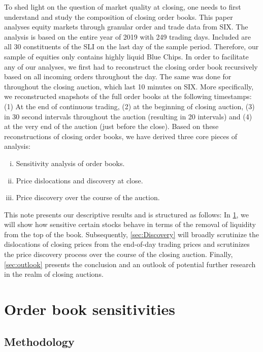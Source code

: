 \documentclass[11pt,a4paper, notitlepage]{article}
\begin{document}
	To shed light on the question of market quality at closing, one needs to first understand and study the composition of closing order books. This paper analyses equity markets through granular order and trade data from \ac{SIX}. The analysis is based on the entire year of 2019 with 249 trading days. Included are all 30 constituents of the \ac{SLI} on the last day of the sample period. Therefore, our sample of equities only contains highly liquid Blue Chips. In order to facilitate any of our analyses, we first had to reconstruct the closing order book recursively based on all incoming orders throughout the day. The same was done for throughout the closing auction, which last 10 minutes on \ac{SIX}. More specifically, we reconstructed snapshots of the full order books at the following timestamps: (1) At the end of continuous trading, (2) at the beginning of closing auction, (3) in 30 second intervals throughout the auction (resulting in 20 intervals) and (4) at the very end of the auction (just before the close). Based on these reconstructions of closing order books, we have derived three core pieces of analysis:
	\begin{enumerate}[(i)]
		\item Sensitivity analysis of order books.
		\item Price dislocations and discovery at close.
		\item Price discovery over the course of the auction.
	\end{enumerate}
	
	This note presents our descriptive results and is structured as follows: In \cref{sec:sensitivities}, we will show how sensitive certain stocks behave in terms of the removal of liquidity from the top of the book. Subsequently, \cref{sec:Discovery} will broadly scrutinize the dislocations of closing prices from the end-of-day trading prices and scrutinizes the price discovery process over the course of the closing auction. Finally, \cref{sec:outlook} presents the conclusion and an outlook of potential further research in the realm of closing auctions.
	
	
	\section{Order book sensitivities} \label{sec:sensitivities}
	
	\subsection{Methodology}\label{subsec:methodology}
	
\end{document}
